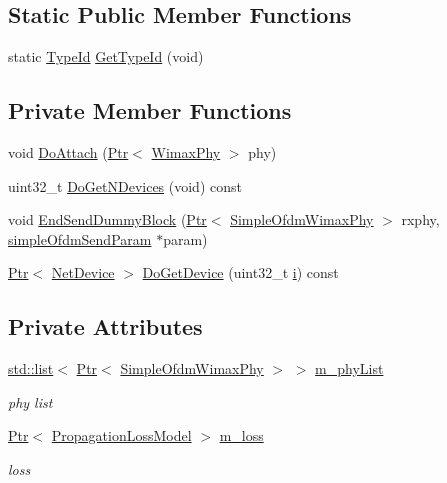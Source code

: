 \subsection*{Static Public Member Functions}
\begin{DoxyCompactItemize}
\item 
static \hyperlink{classns3_1_1TypeId}{Type\+Id} \hyperlink{classns3_1_1SimpleOfdmWimaxChannel_a95a287cb3f5cb4c88290898eeca52652}{Get\+Type\+Id} (void)
\end{DoxyCompactItemize}
\subsection*{Private Member Functions}
\begin{DoxyCompactItemize}
\item 
void \hyperlink{classns3_1_1SimpleOfdmWimaxChannel_a71f8c85e210b85f26a9547a26ebd44b1}{Do\+Attach} (\hyperlink{classns3_1_1Ptr}{Ptr}$<$ \hyperlink{classns3_1_1WimaxPhy}{Wimax\+Phy} $>$ phy)
\item 
uint32\+\_\+t \hyperlink{classns3_1_1SimpleOfdmWimaxChannel_af341a8c85cdd8e0a54a872ac1b763e25}{Do\+Get\+N\+Devices} (void) const 
\item 
void \hyperlink{classns3_1_1SimpleOfdmWimaxChannel_a60993f1ebb709288fb631715c04e9012}{End\+Send\+Dummy\+Block} (\hyperlink{classns3_1_1Ptr}{Ptr}$<$ \hyperlink{classns3_1_1SimpleOfdmWimaxPhy}{Simple\+Ofdm\+Wimax\+Phy} $>$ rxphy, \hyperlink{classns3_1_1simpleOfdmSendParam}{simple\+Ofdm\+Send\+Param} $\ast$param)
\item 
\hyperlink{classns3_1_1Ptr}{Ptr}$<$ \hyperlink{classns3_1_1NetDevice}{Net\+Device} $>$ \hyperlink{classns3_1_1SimpleOfdmWimaxChannel_a0a7be3d52accd57dde65fd053db92a05}{Do\+Get\+Device} (uint32\+\_\+t \hyperlink{lte__uplink__power__control_8m_a6f6ccfcf58b31cb6412107d9d5281426}{i}) const 
\end{DoxyCompactItemize}
\subsection*{Private Attributes}
\begin{DoxyCompactItemize}
\item 
\hyperlink{openflow-interface_8h_afd9bcfa176617760671b67580f536fa7}{std\+::list}$<$ \hyperlink{classns3_1_1Ptr}{Ptr}$<$ \hyperlink{classns3_1_1SimpleOfdmWimaxPhy}{Simple\+Ofdm\+Wimax\+Phy} $>$ $>$ \hyperlink{classns3_1_1SimpleOfdmWimaxChannel_a94f4604c10187d0242c0545275750cda}{m\+\_\+phy\+List}
\begin{DoxyCompactList}\small\item\em phy list \end{DoxyCompactList}\item 
\hyperlink{classns3_1_1Ptr}{Ptr}$<$ \hyperlink{classns3_1_1PropagationLossModel}{Propagation\+Loss\+Model} $>$ \hyperlink{classns3_1_1SimpleOfdmWimaxChannel_a0f7cdabc0c8ce4957eeb63b98bf27b1a}{m\+\_\+loss}
\begin{DoxyCompactList}\small\item\em loss \end{DoxyCompactList}\end{DoxyCompactItemize}
